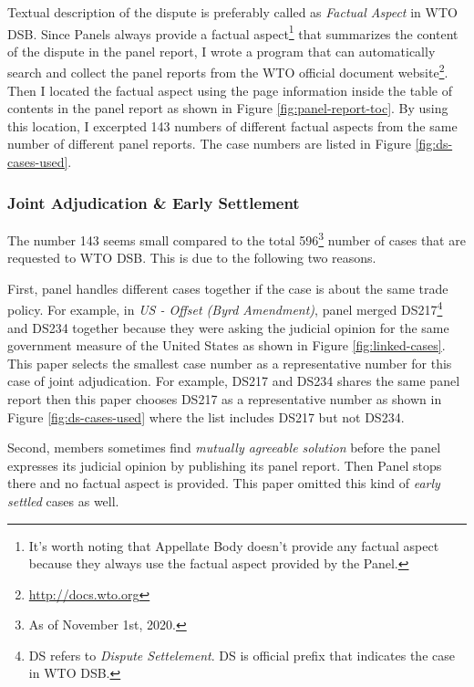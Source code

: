 Textual description of the dispute is preferably called as
\textit{Factual Aspect} in WTO DSB.
Since Panels
always provide a factual aspect\footnote{
   It's worth noting that Appellate Body doesn't provide any factual aspect because they always use the factual aspect provided by the Panel.
}
that summarizes the content of the dispute
in the panel report, %
I wrote a program that can
automatically search and collect
the panel reports from the WTO official document website\footnote{
   \url{http://docs.wto.org}
}.
Then I located the factual aspect using the page information inside the
table of contents in the panel report as shown in Figure \ref{fig:panel-report-toc}.
By using this location, I excerpted 143 numbers of different factual aspects from the same number of different panel reports. The case numbers are listed in Figure \ref{fig:ds-cases-used}.
 
\subsubsection{Joint Adjudication \& Early Settlement}
 
The number 143 seems small compared to the total 596\footnote
{As of November 1st, 2020.} number of cases that are requested to WTO DSB. This is due to the following two reasons.
 
First, panel handles different cases together if the case is about the
same trade policy. For example, in \textit{US - Offset (Byrd Amendment)}, panel merged DS217\footnote{
   DS refers to \textit{Dispute Settelement}. DS is official prefix that indicates the case in WTO DSB.
} and DS234 together because they were asking the judicial opinion for the same government measure of the United States as shown in Figure \ref{fig:linked-cases}.
This paper selects the smallest case number as a representative number for this case of joint adjudication.
For example, DS217 and DS234 shares the same panel report then this paper chooses DS217 as a representative number as shown in Figure \ref{fig:ds-cases-used} where the list includes DS217 but not DS234.
 
Second, members sometimes find \textit{mutually agreeable solution} before the panel expresses its judicial opinion by publishing its panel report. Then Panel stops there and no factual aspect is provided. This paper omitted this kind of \textit{early settled} cases as well.
 
 
